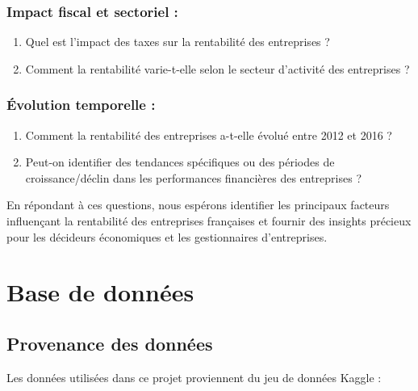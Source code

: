 \documentclass[mstat,12pt]{unswthesis}
\begin{document}
\subsection{\texorpdfstring{\textbf{Impact fiscal et sectoriel
:}}{Impact fiscal et sectoriel :}}\label{impact-fiscal-et-sectoriel}

\begin{enumerate}
\def\labelenumi{\alph{enumi}.}
\item
  Quel est l'impact des taxes sur la rentabilité des entreprises ?
\item
  Comment la rentabilité varie-t-elle selon le secteur d'activité des
  entreprises ?
\end{enumerate}

\subsection{\texorpdfstring{\textbf{Évolution temporelle
:}}{Évolution temporelle :}}\label{uxe9volution-temporelle}

\begin{enumerate}
\def\labelenumi{\alph{enumi}.}
\item
  Comment la rentabilité des entreprises a-t-elle évolué entre 2012 et
  2016 ?
\item
  Peut-on identifier des tendances spécifiques ou des périodes de
  croissance/déclin dans les performances financières des entreprises ?
\end{enumerate}

\medskip

En répondant à ces questions, nous espérons identifier les principaux
facteurs influençant la rentabilité des entreprises françaises et
fournir des insights précieux pour les décideurs économiques et les
gestionnaires d'entreprises.

\chapter{Base de données}\label{base-de-donnuxe9es}

\section{Provenance des données}\label{provenance-des-donnuxe9es}

Les données utilisées dans ce projet proviennent du jeu de données
Kaggle : \medskip
\end{document}
